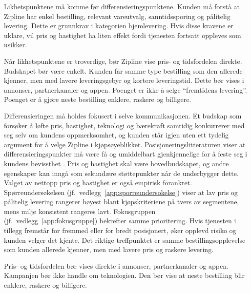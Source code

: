 Likhetspunktene må komme før differensieringspunktene. Kunden må forstå at
Zipline har enkel bestilling, relevant vareutvalg, sanntidssporing og
pålitelig levering. Dette er grunnkrav i kategorien hjemlevering. Hvis disse
kravene er uklare, vil pris og hastighet ha liten effekt fordi tjenesten
fortsatt oppleves som usikker.

Når likhetspunktene er troverdige, bør Zipline vise pris- og tidsfordelen
direkte. Budskapet bør være enkelt. Kunden får samme type bestilling som den
allerede kjenner, men med lavere leveringsgebyr og kortere leveringstid.
Dette bør vises i annonser, partnerkanaler og appen. Poenget er ikke å selge
``fremtidens levering''. Poenget er å gjøre neste bestilling enklere,
raskere og billigere.

Differensieringen må holdes fokusert i selve kommunikasjonen. Et
budskap som forsøker å løfte pris, hastighet, teknologi og bærekraft
samtidig konkurrerer med seg selv om kundens oppmerksomhet, og kunden
står igjen uten ett tydelig argument for å velge Zipline i
kjøpsøyeblikket. Posisjoneringslitteraturen viser at
differensieringspunkter må være få og umiddelbart gjenkjennelige for å
feste seg i kundens bevissthet \parencite[304]{keller2013}. Pris og
hastighet skal være hovedbudskapet, og andre egenskaper kan inngå som
sekundære støttepunkter når de underbygger dette. Valget av nettopp
pris og hastighet er også empirisk forankret. Spørreundersøkelsen
(jf.\ vedlegg~\ref{app:sporreundersokelse}) viser at lav pris og
pålitelig levering rangerer høyest blant kjøpskriteriene på tvers av
segmentene, mens miljø konsistent rangeres lavt. Fokusgruppen (jf.\
vedlegg~\ref{app:fokusgruppe}) bekrefter samme prioritering. Hvis
tjenesten i tillegg fremstår for fremmed eller for bredt posisjonert,
øker opplevd risiko og kunden velger det kjente. Det riktige
treffpunktet er samme bestillingsopplevelse som kunden allerede
kjenner, men med lavere pris og raskere levering.

Pris- og tidsfordelen bør vises direkte i annonser, partnerkanaler og appen.
Kampanjen bør ikke handle om teknologien. Den bør vise at neste bestilling
blir enklere, raskere og billigere.
